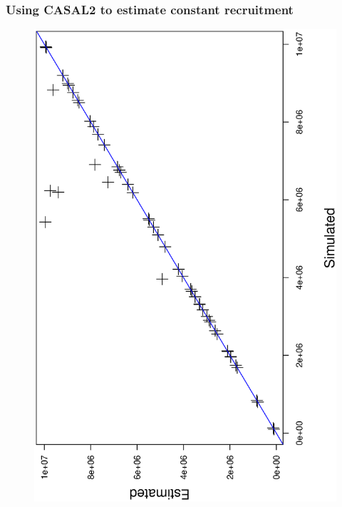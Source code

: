 \documentclass{beamer}
\begin{document}
\begin{frame}
\frametitle{Using CASAL2 to estimate constant recruitment}

\begin{figure}
  \includegraphics[scale=0.38, angle=-90]{../../TestCASAL2_withSimulatedData/StockDescriptionInNumbers/EstimateSingleConstantRecruitment/ByPassingInitialAbundancesToCASAL2/Results/Graphics/SimVsEst.ps}
  \end{figure}

\end{frame}
\end{document}
